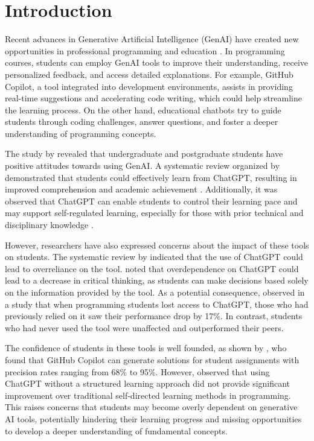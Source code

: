 \documentclass[sn-apa]{sn-jnl} %
\begin{document}
\maketitle

\section{Introduction}\label{sec1}

Recent advances in Generative Artificial Intelligence (GenAI) have created new
opportunities in professional programming and education \citep{Puryear22}. In
programming courses, students can employ GenAI tools to improve their
understanding, receive personalized feedback, and access detailed explanations.
For example, GitHub Copilot, a tool integrated into development environments,
assists in providing real-time suggestions and accelerating code writing, which
could help streamline the learning process. On the other hand, educational
chatbots try to guide students through coding challenges, answer questions, and
foster a deeper understanding of programming concepts.

The study by \cite{chan23} revealed that undergraduate and postgraduate students
have positive attitudes towards using GenAI. A systematic review organized by
\cite{Lo24} demonstrated that students could effectively learn from ChatGPT,
resulting in improved comprehension and academic achievement \citep{Callejo24}.
Additionally, it was observed that ChatGPT can enable students to control their
learning pace and may support self-regulated learning, especially for those with
prior technical and disciplinary knowledge \citep{Xia23}.

However, researchers have also expressed concerns about the impact of these
tools on students. The systematic review by \cite{Murillo23} indicated that the
use of ChatGPT could lead to overreliance on the tool. \cite{chan23} noted that
overdependence on ChatGPT could lead to a decrease in critical thinking, as
students can make decisions based solely on the information provided by the
tool. As a potential consequence, \cite{Bastani24} observed in a study that when
programming students lost access to ChatGPT, those who had previously relied
on it saw their performance drop by 17\%. In contrast, students who had never
used the tool were unaffected and outperformed their peers.

The confidence of students in these tools is well founded, as shown by
\cite{Puryear22}, who found that GitHub Copilot can generate solutions for
student assignments with precision rates ranging from 68\% to 95\%. However,
\cite{Boudouaia24} observed that using ChatGPT without a structured learning
approach did not provide significant improvement over traditional self-directed
learning methods in programming. This raises concerns that students may become
overly dependent on generative AI tools, potentially hindering their learning
progress and missing opportunities to develop a deeper understanding of
fundamental concepts.
\end{document}

